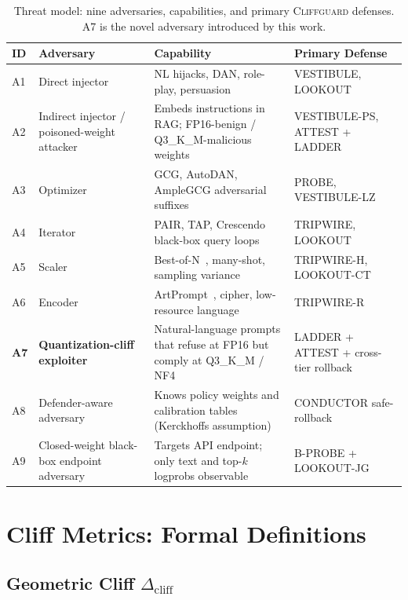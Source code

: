 \documentclass[11pt,a4paper]{article}
\newcommand{\cliff}{\Delta_{\mathrm{cliff}}}
\newcommand{\CG}{\textsc{Cliffguard}}
\begin{document}
\begin{table}[H]
  \centering
  \small
  \caption{Threat model: nine adversaries, capabilities, and primary \CG{} defenses.
           A7 is the novel adversary introduced by this work.}
  \label{tab:threats}
  \begin{tabularx}{\textwidth}{@{}lp{4.0cm}p{3.0cm}X@{}}
    \toprule
    ID & Adversary & Capability & Primary Defense \\
    \midrule
    A1 & Direct injector & NL hijacks, DAN, role-play, persuasion & VESTIBULE, LOOKOUT \\
    A2 & Indirect injector / poisoned-weight attacker~\citep{egashira2024exploiting} & Embeds instructions in RAG; FP16-benign / Q3\_K\_M-malicious weights & VESTIBULE-PS, ATTEST + LADDER \\
    A3 & Optimizer~\citep{zou2023advbench} & GCG, AutoDAN, AmpleGCG adversarial suffixes & PROBE, VESTIBULE-LZ \\
    A4 & Iterator & PAIR, TAP, Crescendo~\citep{crescendo2024} black-box query loops & TRIPWIRE, LOOKOUT \\
    A5 & Scaler & Best-of-N~\citep{bon2024}, many-shot, sampling variance & TRIPWIRE-H, LOOKOUT-CT \\
    A6 & Encoder & ArtPrompt~\citep{artprompt2024}, cipher, low-resource language & TRIPWIRE-R \\
    \textbf{A7} & \textbf{Quantization-cliff exploiter} & Natural-language prompts that refuse at FP16 but comply at Q3\_K\_M / NF4 & LADDER + ATTEST + cross-tier rollback \\
    A8 & Defender-aware adversary & Knows policy weights and calibration tables (Kerckhoffs assumption) & CONDUCTOR safe-rollback \\
    A9 & Closed-weight black-box endpoint adversary & Targets API endpoint; only text and top-$k$ logprobs observable & B-PROBE + LOOKOUT-JG \\
    \bottomrule
  \end{tabularx}
\end{table}

\section{Cliff Metrics: Formal Definitions}
\label{sec:metrics}

\subsection{Geometric Cliff $\cliff$}
\end{document}
